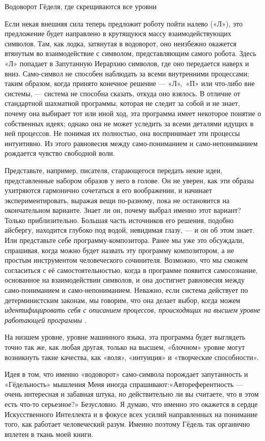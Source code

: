 \documentclass[../main.tex]{subfiles}
\begin{document}
Водоворот Гёделя, где скрещиваются все уровни

Если некая внешняя сила теперь предложит роботу пойти налево («Л»), это предложение будет направлено в крутящуюся массу взаимодействующих символов. Там, как лодка, затянутая в водоворот, оно неизбежно окажется втянутым во взаимодействие с символом, представляющим самого робота. Здесь «Л» попадает в Запутанную Иерархию символов, где оно передается наверх и вниз. Само-символ не способен наблюдать за всеми внутренними процессами; таким образом, когда принято конечное решение --- «Л»,~«П» или что-либо вне системы, --- система не способна сказать, откуда оно взялось. В отличие от стандартной шахматной программы, которая не следит за собой и не знает, почему она выбирает тот или иной ход, эта программа имеет некоторое понятие о собственных идеях; однако она не может уследить за всеми деталями идущих в ней процессов. Не понимая их полностью, она воспринимает эти процессы интуитивно. Из этого равновесия между само-пониманием и само-непониманием рождается чувство свободной воли.

Представьте, например, писателя, старающегося передать некие идеи, представленные набором образов у него в голове. Он не уверен, как эти образы ухитряются гармонично сочетаться в его воображении, и начинает экспериментировать, выражая вещи по-разному, пока не остановится на окончательном варианте. Знает ли он, почему выбрал именно этот вариант? Только приблизительно. Большая часть источников его решения, подобно айсбергу, находится глубоко под водой, невидимая глазу, --- и он об этом знает. Или представьте себе программу-композитора. Ранее мы уже это обсуждали, спрашивая, когда можно будет назвать эту программу композитором, а не простым инструментом человеческого сочинителя. Возможно, что мы сможем согласиться с её самостоятельностью, когда в программе появится самосознание, основанное на взаимодействии символов, и она достигнет равновесия между само-пониманием и само-непониманием. Неважно, если система действует по детерминистским законам, мы говорим, что она делает выбор, когда можем \emph{идентифицировать себя с описанием процессов, происходящих на высшем уровне работающей программы} .

На низшем уровне, уровне машинного языка, эта программа будет выглядеть точно так же, как любая другая, только на высшем, «блочном» уровне могут возникнуть такие качества, как «воля», «интуиция» и «творческие способности».

Идея в том, что именно «водоворот» само-символа порождает запутанность и «Гёдельность» мышления Меня иногда спрашивают:«Автореферентность --- очень интересная и забавная штука, но действительно ли вы считаете, что в этом есть что-то серьезное?» Безусловно. Я думаю, что именно это окажется в сердце Искусственного Интеллекта и в фокусе всех усилий направленных на понимание того, как работает человеческий разум. Именно поэтому Гёдель так органично вплетен в ткань моей книги.
\end{document}
